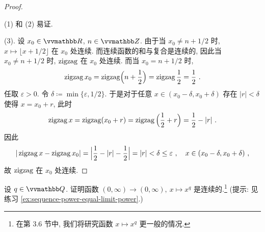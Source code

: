 \begin{proof}
    \begin{center}
    \end{center}

    (1) 和 (2) 易证.

    (3). 设 \(x_0 \in \R\), \(n \in \Z\). 由于当 \(x_0 \neq n + 1 / 2\) 时, \(x \mapsto \lfloor x + 1 / 2 \rfloor\) 在 \(x_0\) 处连续. 而连续函数的和与复合是连续的, 因此当 \(x_0 \neq n + 1 / 2\) 时, \(\operatorname{zigzag}\) 在 \(x_0\) 处连续. 而当 \(x_0 = n + 1 / 2\) 时,
    \[
        \operatorname{zigzag} x_0 = \operatorname{zigzag} \Bigl(n + \frac{1}{2}\Bigr) = \operatorname{zigzag} \frac{1}{2} = \frac{1}{2}\ .
    \]
    任取 \(\varepsilon > 0\). 令 \(\delta \coloneqq \min\{\varepsilon, 1 / 2\}\). 于是对于任意 \(x \in (x_0 - \delta, x_0 + \delta)\) 存在 \(|r| < \delta\) 使得 \(x = x_0 + r\), 此时
    \[
        \operatorname{zigzag} x = \operatorname{zigzag}(x_0 + r) = \operatorname{zigzag}\Big(\frac{1}{2} + r\Big) = \frac{1}{2} - |r|\ .
    \]
    因此
    \[
        |\operatorname{zigzag} x - \operatorname{zigzag} x_0| = \Bigl|\frac{1}{2} - |r| - \frac{1}{2}\Bigr| = |r| < \delta \leq \varepsilon\ ,\quad x \in (x_0 - \delta, x_0 + \delta)\ ,
    \]
    故 \(\operatorname{zigzag}\) 在 \(x_0\) 处连续.
\end{proof}

\begin{exercise}
    设 \(q \in \Q\). 证明函数 \((0, \infty) \to (0, \infty),\ x \mapsto x^q\) 是连续的.\footnote{在第 3.6 节中, 我们将研究函数 \(x \mapsto x^q\) 更一般的情况.} (提示: 见练习 \ref{ex:sequence-power-equal-limit-power}.)
\end{exercise}

